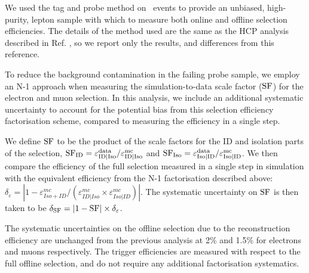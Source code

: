  
We used the tag and probe method on \dyll~events to provide an unbiased, high-purity, 
lepton sample with which to measure both online and offline selection efficiencies.
The details of the method used are the same as the HCP analysis described
in Ref. \cite{hcp2012Note}, so we report only the results, and differences
from this reference.

To reduce the background contamination in the failing probe sample,
we employ an N-1 approach when measuring the simulation-to-data scale factor ($\rm{SF}$)
for the electron and muon selection. In this analysis,
we include an additional systematic uncertainty to account for
the potential bias from this selection efficiency factorisation scheme, compared
to measuring the efficiency in a single step. 

We define $\rm{SF}$ to be the product
of the scale factors for the ID and isolation parts of the selection,
$\rm{SF_{ID}}=\varepsilon_{ID | Iso}^{data}/\varepsilon_{ID | Iso}^{mc}$
and $\rm{SF_{Iso}} = \varepsilon_{Iso | ID}^{data}/\varepsilon_{Iso | ID}^{mc}$.
We then compare the efficiency of the full selection measured in a single step
in simulation with the equivalent efficiency from the N-1 factorisation described above:
\hbox{$\delta_{\varepsilon} = |1 - \varepsilon_{Iso+ID}^{mc} / (\varepsilon_{ID | Iso}^{mc} \times \varepsilon_{Iso | ID}^{mc})|$}.
The systematic uncertainty on $\rm{SF}$ is then taken to be $\delta_{\rm{SF}} = |1-\rm{SF}| \times \delta_{\varepsilon}$.

The systematic uncertainties on the offline selection due to the 
reconstruction efficiency are unchanged from the previous
analysis at 2\% and 1.5\% for electrons and muons respectively.
The trigger efficiencies
are measured with respect to the full offline selection, and do not
require any additional factorisation systematics.

